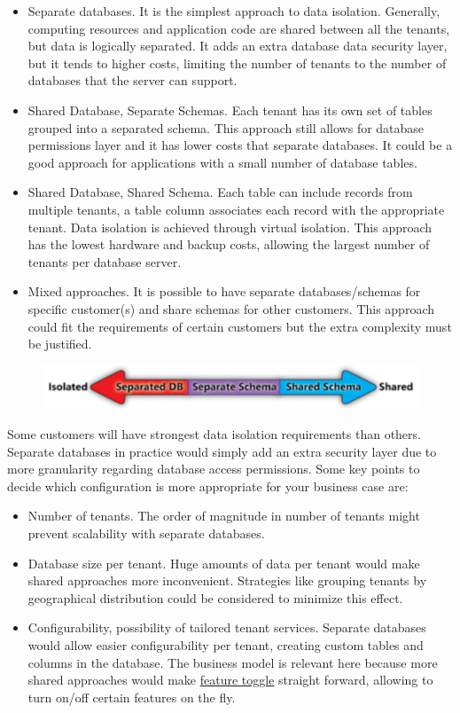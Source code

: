 \documentclass[11pt,english]{article} %
\begin{document}
\begin{itemize}
    \item Separate databases. It is the simplest approach to data isolation. Generally, computing resources and application code are shared between all the tenants, but data is logically separated. It adds an extra database data security layer, but it tends to higher costs, limiting the number of tenants to the number of databases that the server can support.
    \item Shared Database, Separate Schemas. Each tenant has its own set of tables grouped into a separated schema. This approach still allows for database permissions layer and it has lower costs that separate databases. It could be a good approach for applications with a small number of database tables.
    \item Shared Database, Shared Schema. Each table can include records from multiple tenants, a table column associates each record with the appropriate tenant. Data isolation is achieved through virtual isolation. This approach has the lowest hardware and backup costs, allowing the largest number of tenants per database server.
    \item Mixed approaches. It is possible to have separate databases/schemas for specific customer(s) and share schemas for other customers. This approach could fit the requirements of certain customers but the extra complexity must be justified.
\end{itemize}
\begin{figure}[ht]
  \centering
  \includegraphics[scale=0.225]{img/multitenant-approaches.png}
\end{figure}
Some customers will have strongest data isolation requirements than others. Separate databases in practice would simply add an extra security layer due to more granularity regarding database access permissions. Some key points to decide which configuration is more appropriate for your business case are:
\begin{itemize}
    \item Number of tenants. The order of magnitude in number of tenants might prevent scalability with separate databases.
    \item Database size per tenant. Huge amounts of data per tenant would make shared approaches more inconvenient. Strategies like grouping tenants by geographical distribution could be considered to minimize this effect.
    \item Configurability, possibility of tailored tenant services. Separate databases would allow easier configurability per tenant, creating custom tables and columns in the database. The business model is relevant here because more shared approaches would make \href{https://en.wikipedia.org/wiki/Feature_toggle}{feature toggle} straight forward, allowing to turn on/off certain features on the fly.
\end{itemize}
\end{document}

